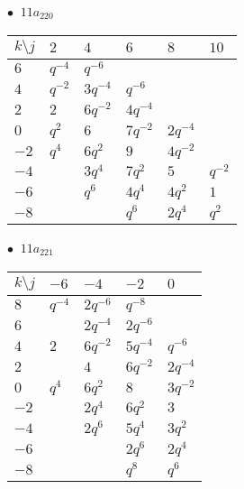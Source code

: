 \begin{minipage}{\linewidth}
$\bullet\ $ $11a_{220}$ \vspace{0.5em} \\
\begin{tabular}{l|lllll}
$k \setminus j$ & $2$ & $4$ & $6$ & $8$ & $10$ \\
\hline
$6$ & $q^{-4}$ & $q^{-6}$ &  &  &  \\
$4$ & $q^{-2}$ & $3q^{-4}$ & $q^{-6}$ &  &  \\
$2$ & $2$ & $6q^{-2}$ & $4q^{-4}$ &  &  \\
$0$ & $q^{2}$ & $6$ & $7q^{-2}$ & $2q^{-4}$ &  \\
$-2$ & $q^{4}$ & $6q^{2}$ & $9$ & $4q^{-2}$ &  \\
$-4$ &  & $3q^{4}$ & $7q^{2}$ & $5$ & $q^{-2}$ \\
$-6$ &  & $q^{6}$ & $4q^{4}$ & $4q^{2}$ & $1$ \\
$-8$ &  &  & $q^{6}$ & $2q^{4}$ & $q^{2}$ \\
\end{tabular}
\vspace{2em}
\end{minipage}
%
\begin{minipage}{\linewidth}
$\bullet\ $ $11a_{221}$ \vspace{0.5em} \\
\begin{tabular}{l|llll}
$k \setminus j$ & $-6$ & $-4$ & $-2$ & $0$ \\
\hline
$8$ & $q^{-4}$ & $2q^{-6}$ & $q^{-8}$ &  \\
$6$ &  & $2q^{-4}$ & $2q^{-6}$ &  \\
$4$ & $2$ & $6q^{-2}$ & $5q^{-4}$ & $q^{-6}$ \\
$2$ &  & $4$ & $6q^{-2}$ & $2q^{-4}$ \\
$0$ & $q^{4}$ & $6q^{2}$ & $8$ & $3q^{-2}$ \\
$-2$ &  & $2q^{4}$ & $6q^{2}$ & $3$ \\
$-4$ &  & $2q^{6}$ & $5q^{4}$ & $3q^{2}$ \\
$-6$ &  &  & $2q^{6}$ & $2q^{4}$ \\
$-8$ &  &  & $q^{8}$ & $q^{6}$ \\
\end{tabular}
\vspace{2em}
\end{minipage}
%
